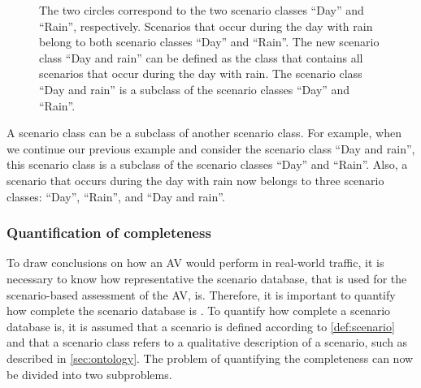 \setlength{\venncircle}{10em}
\begin{figure}
	\centering
	\caption{The two circles correspond to the two scenario classes ``Day'' and ``Rain'', respectively. Scenarios that occur during the day with rain belong to both scenario classes ``Day'' and ``Rain''. The new scenario class ``Day and rain'' can be defined as the class that contains all scenarios that occur during the day with rain. The scenario class ``Day and rain'' is a subclass of the scenario classes ``Day'' and ``Rain''.}
	\label{fig:venn diagram scenario class}
\end{figure}

A scenario class can be a subclass of another scenario class. For example, when we continue our previous example and consider the scenario class ``Day and rain'', this scenario class is a subclass of the scenario classes ``Day'' and ``Rain''. Also, a scenario that occurs during the day with rain now belongs to three scenario classes: ``Day'', ``Rain'', and ``Day and rain''.

\subsubsection{Quantification of completeness}
\label{sec:completeness}

To draw conclusions on how an AV would perform in real-world traffic, it is necessary to know how representative the scenario database, that is used for the scenario-based assessment of the AV, is. Therefore, it is important to quantify how complete the scenario database is \cite{geyer2014, alvarez2017prospective, stellet2015taxonomy}. To quantify how complete a scenario database is, it is assumed that a scenario is defined according to \cref{def:scenario} and that a scenario class refers to a qualitative description of a scenario, such as described in \cref{sec:ontology}. The problem of quantifying the completeness can now be divided into two subproblems.

